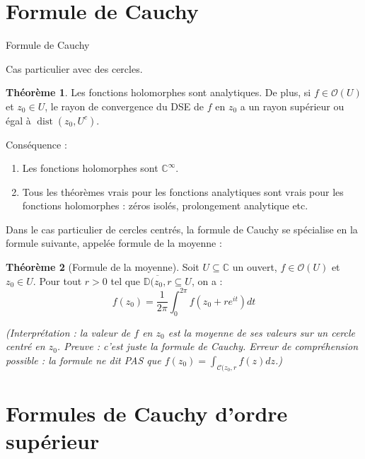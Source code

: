 \documentclass[11pt,a4paper]{book}
\newcommand{\D}{\mathbb{D}}
\newcommand{\C}{\mathbb{C}}
\theoremstyle{definition}
\newtheorem{theoreme}{Th\'eor\`eme}[section]
\theoremstyle{plain}
\begin{document}





\section{Formule de Cauchy}

Formule de Cauchy


Cas particulier avec des cercles.

\begin{theoreme}
Les fonctions holomorphes sont analytiques.
De plus, si $f\in \mathcal O(U)$ et $z_0 \in U$, le rayon de convergence du DSE de $f$ en $z_0$ a un rayon supérieur ou égal à $\operatorname{dist}(z_0,U^c)$.
\end{theoreme}

Conséquence : 
\begin{enumerate}
\item Les fonctions holomorphes sont $\C^\infty$.
\item Tous les théorèmes vrais pour les fonctions analytiques sont vrais pour les fonctions holomorphes : zéros isolés, prolongement analytique etc.
\end{enumerate}

Dans le cas particulier de cercles centrés, la formule de Cauchy se spécialise en la formule suivante, appelée formule de la moyenne : 
\begin{theoreme}[Formule de la moyenne]
Soit $U\subseteq \C$ un ouvert,  $f \in \mathcal O(U)$ et $z_0\in U$.
Pour tout $r>0$ tel que $\overline{\D(z_0,r} \subseteq U$, on a :
\[ f(z_0) = \frac{1}{2\pi}\int_0^{2\pi} f\left(z_0+re^{it}\right)dt\]
\end{theoreme}
\emph{(Interprétation : la valeur de $f$ en $z_0$ est la moyenne de ses valeurs sur un cercle centré en $z_0$. 
Preuve : c'est juste la formule de Cauchy. 
Erreur de compréhension possible : la formule ne dit PAS que $f(z_0)=\int_{\mathcal C(z_0,r} f(z)dz$.)}


\section{Formules de Cauchy d'ordre supérieur}
 
\end{document}
